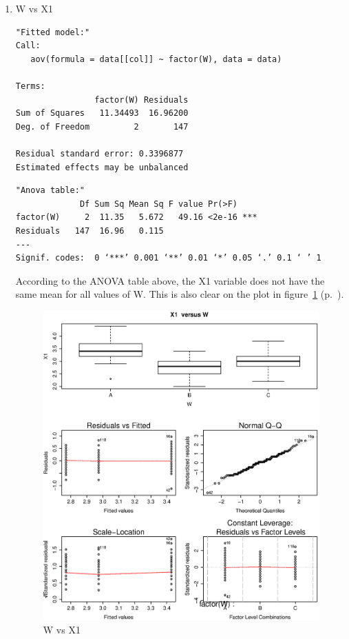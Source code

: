 \documentclass{article}
\begin{document}
\begin{enumerate}
  \item W vs X1
  \begin{lstlisting}
"Fitted model:"
Call:
   aov(formula = data[[col]] ~ factor(W), data = data)

Terms:
                factor(W) Residuals
Sum of Squares   11.34493  16.96200
Deg. of Freedom         2       147

Residual standard error: 0.3396877
Estimated effects may be unbalanced
  \end{lstlisting}
  
  \begin{lstlisting}
"Anova table:"
             Df Sum Sq Mean Sq F value Pr(>F)    
factor(W)     2  11.35   5.672   49.16 <2e-16 ***
Residuals   147  16.96   0.115                   
---
Signif. codes:  0 ‘***’ 0.001 ‘**’ 0.01 ‘*’ 0.05 ‘.’ 0.1 ‘ ’ 1
  \end{lstlisting}
  
  According to the ANOVA table above, the X1 variable does not have the same
  mean for all values of W. This is also clear on the plot in
  figure~\ref{fig:X1vsW} (p.~\pageref{fig:X1vsW}).
  
  \begin{figure}[H]
  \centering
  \includegraphics[scale=0.6]{X1vsW.eps}
  \caption{W vs X1}
  \label{fig:X1vsW}
  \end{figure}
  

\end{enumerate}
\end{document}
